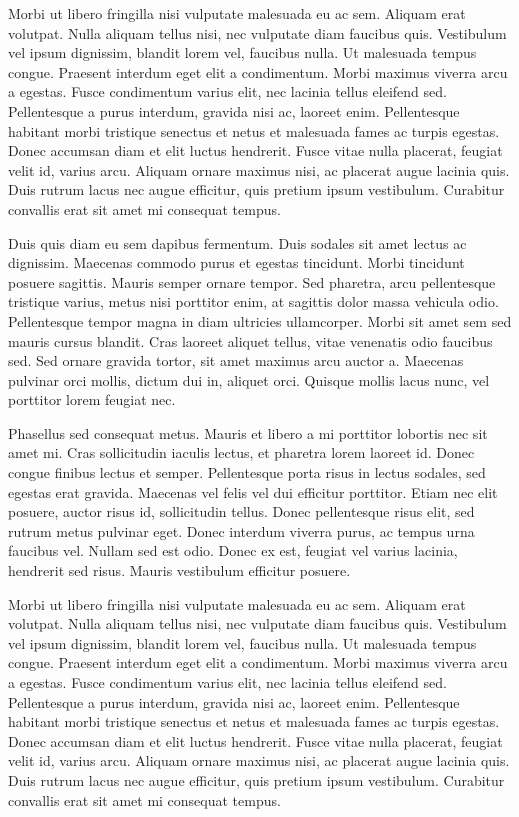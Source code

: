 Morbi ut libero fringilla nisi vulputate malesuada eu ac sem. Aliquam
erat volutpat. Nulla aliquam tellus nisi, nec vulputate diam faucibus
quis. Vestibulum vel ipsum dignissim, blandit lorem vel, faucibus nulla.
Ut malesuada tempus congue. Praesent interdum eget elit a condimentum.
Morbi maximus viverra arcu a egestas. Fusce condimentum varius elit,
nec lacinia tellus eleifend sed. Pellentesque a purus interdum, gravida
nisi ac, laoreet enim. Pellentesque habitant morbi tristique senectus
et netus et malesuada fames ac turpis egestas. Donec accumsan diam et
elit luctus hendrerit. Fusce vitae nulla placerat, feugiat velit id,
varius arcu. Aliquam ornare maximus nisi, ac placerat augue lacinia
quis. Duis rutrum lacus nec augue efficitur, quis pretium ipsum
vestibulum. Curabitur convallis erat sit amet mi consequat tempus.

Duis quis diam eu sem dapibus fermentum. Duis sodales sit amet lectus
ac dignissim. Maecenas commodo purus et egestas tincidunt. Morbi tincidunt
 posuere sagittis. Mauris semper ornare tempor. Sed pharetra, arcu pellentesque
 tristique varius, metus nisi porttitor enim, at sagittis dolor massa vehicula
 odio. Pellentesque tempor magna in diam ultricies ullamcorper. Morbi sit amet
 sem sed mauris cursus blandit. Cras laoreet aliquet tellus, vitae venenatis
 odio faucibus sed. Sed ornare gravida tortor, sit amet maximus arcu auctor
 a. Maecenas pulvinar orci mollis, dictum dui in, aliquet orci. Quisque mollis
 lacus nunc, vel porttitor lorem feugiat nec.

 Phasellus sed consequat metus. Mauris et libero a mi porttitor lobortis nec sit
amet mi. Cras sollicitudin iaculis lectus, et pharetra lorem laoreet id. Donec
congue finibus lectus et semper. Pellentesque porta risus in lectus sodales, sed
egestas erat gravida. Maecenas vel felis vel dui efficitur porttitor. Etiam nec
elit posuere, auctor risus id, sollicitudin tellus. Donec pellentesque risus
elit, sed rutrum metus pulvinar eget. Donec interdum viverra purus, ac tempus
urna faucibus vel. Nullam sed est odio. Donec ex est, feugiat vel varius
lacinia, hendrerit sed risus. Mauris vestibulum efficitur posuere.

Morbi ut libero fringilla nisi vulputate malesuada eu ac sem. Aliquam
erat volutpat. Nulla aliquam tellus nisi, nec vulputate diam faucibus
quis. Vestibulum vel ipsum dignissim, blandit lorem vel, faucibus nulla.
Ut malesuada tempus congue. Praesent interdum eget elit a condimentum.
Morbi maximus viverra arcu a egestas. Fusce condimentum varius elit,
nec lacinia tellus eleifend sed. Pellentesque a purus interdum, gravida
nisi ac, laoreet enim. Pellentesque habitant morbi tristique senectus
et netus et malesuada fames ac turpis egestas. Donec accumsan diam et
elit luctus hendrerit. Fusce vitae nulla placerat, feugiat velit id,
varius arcu. Aliquam ornare maximus nisi, ac placerat augue lacinia
quis. Duis rutrum lacus nec augue efficitur, quis pretium ipsum
vestibulum. Curabitur convallis erat sit amet mi consequat tempus.

